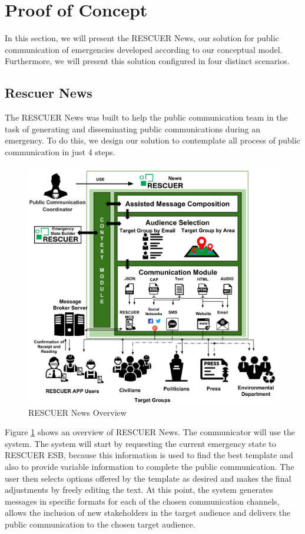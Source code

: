 \section{Proof of Concept}\label{sec:proofConcept}
In this section, we will present the RESCUER News, our solution for public communication of emergencies developed according to our conceptual model. Furthermore, we will present this solution configured in four distinct scenarios.

\subsection{Rescuer News}

The RESCUER News was built to help the public communication team in the task of generating and disseminating public communications during an emergency. To do this, we design our solution to contemplate all process of public communication in just 4 steps.

\begin{figure}
\centering
\includegraphics[width=\linewidth]{images/RescuerNewsConcept}
\caption{RESCUER News Overview}
\label{fig:rescuerOverview}
\end{figure} 

Figure \ref{fig:rescuerOverview} shows an overview of RESCUER News. The communicator will use the system. The system will start by requesting the current emergency state to RESCUER ESB, because this information is used to find the best template and also to provide variable information to complete the public communication. The user then selects options offered by the template as desired and makes the final adjustments by freely editing the text. At this point, the system generates messages in specific formats for each of the chosen communication channels, allows the inclusion of new stakeholders in the target audience and delivers the public communication to the chosen target audience.

